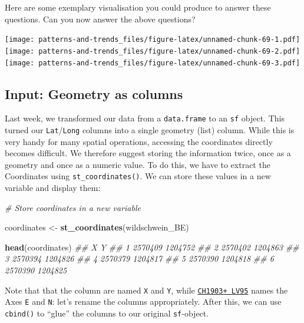 \documentclass[]{book}
\newenvironment{Shaded}{\begin{snugshade}}{\end{snugshade}}
\newcommand{\CommentTok}[1]{\textcolor[rgb]{0.56,0.35,0.01}{\textit{#1}}}
\newcommand{\KeywordTok}[1]{\textcolor[rgb]{0.13,0.29,0.53}{\textbf{#1}}}
\newcommand{\NormalTok}[1]{#1}
\newcommand{\StringTok}[1]{\textcolor[rgb]{0.31,0.60,0.02}{#1}}
\begin{document}
Here are some exemplary visualisation you could produce to answer these questions. Can you now answer the above questions?

\texttt{[image: patterns-and-trends\_files/figure-latex/unnamed-chunk-69-1.pdf]} \texttt{[image: patterns-and-trends\_files/figure-latex/unnamed-chunk-69-2.pdf]} \texttt{[image: patterns-and-trends\_files/figure-latex/unnamed-chunk-69-3.pdf]}

\hypertarget{input-geometry-as-columns}{%
\subsection{Input: Geometry as columns}\label{input-geometry-as-columns}}

Last week, we transformed our data from a \texttt{data.frame} to an \texttt{sf} object. This turned our \texttt{Lat}/\texttt{Long} columns into a single geometry (list) column. While this is very handy for many spatial operations, accessing the coordinates directly becomes difficult. We therefore suggest storing the information twice, once as a geometry and once as a numeric value. To do this, we have to extract the Coordinates using \texttt{st\_coordinates()}. We can store these values in a new variable and display them:

\begin{Shaded}
\begin{Highlighting}[]
\CommentTok{# Store coordinates in a new variable}

\NormalTok{coordinates <-}\StringTok{ }\KeywordTok{st_coordinates}\NormalTok{(wildschwein_BE)}

\KeywordTok{head}\NormalTok{(coordinates)}
\CommentTok{##         X       Y}
\CommentTok{## 1 2570409 1204752}
\CommentTok{## 2 2570402 1204863}
\CommentTok{## 3 2570394 1204826}
\CommentTok{## 4 2570379 1204817}
\CommentTok{## 5 2570390 1204818}
\CommentTok{## 6 2570390 1204825}
\end{Highlighting}
\end{Shaded}

Note that that the column are named \texttt{X} and \texttt{Y}, while \href{https://www.swisstopo.admin.ch/de/wissen-fakten/geodaesie-vermessung/neue-koordinaten.html}{\texttt{CH1903+\ LV95}} names the Axes \texttt{E} and \texttt{N}: let's rename the columns appropriately. After this, we can use \texttt{cbind()} to ``glue'' the columns to our original \texttt{sf}-object.
\end{document}
